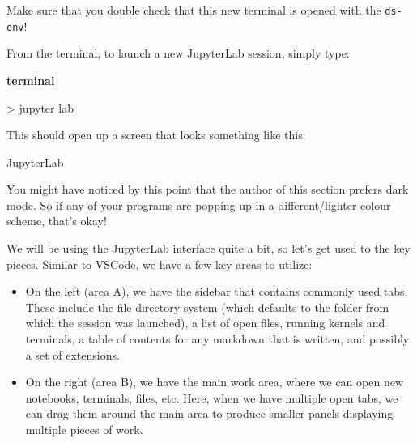 \documentclass[
  letterpaper,
  DIV=11,
  numbers=noendperiod]{scrreprt}
\newenvironment{Shaded}{\begin{snugshade}}{\end{snugshade}}
\newcommand{\ExtensionTok}[1]{\textcolor[rgb]{0.00,0.23,0.31}{#1}}
\newcommand{\NormalTok}[1]{\textcolor[rgb]{0.00,0.23,0.31}{#1}}
\newcommand{\OperatorTok}[1]{\textcolor[rgb]{0.37,0.37,0.37}{#1}}
\begin{document}
\begin{tcolorbox}[enhanced jigsaw, colframe=quarto-callout-note-color-frame, toprule=.15mm, colback=white, leftrule=.75mm, rightrule=.15mm, breakable, colbacktitle=quarto-callout-note-color!10!white, arc=.35mm, bottomtitle=1mm, bottomrule=.15mm, titlerule=0mm, title=\textcolor{quarto-callout-note-color}{\faInfo}\hspace{0.5em}{Conda Reminder!}, toptitle=1mm, left=2mm, opacityback=0, coltitle=black, opacitybacktitle=0.6]
Make sure that you double check that this new terminal is opened with
the \texttt{ds-env}!
\end{tcolorbox}

From the terminal, to launch a new JupyterLab session, simply type:

\textbf{terminal}

\begin{Shaded}
\begin{Highlighting}[]
\OperatorTok{\textgreater{}}\NormalTok{ jupyter }\ExtensionTok{lab}
\end{Highlighting}
\end{Shaded}

This should open up a screen that looks something like this:

JupyterLab

\begin{tcolorbox}[enhanced jigsaw, colframe=quarto-callout-tip-color-frame, toprule=.15mm, colback=white, leftrule=.75mm, rightrule=.15mm, breakable, colbacktitle=quarto-callout-tip-color!10!white, arc=.35mm, bottomtitle=1mm, bottomrule=.15mm, titlerule=0mm, title=\textcolor{quarto-callout-tip-color}{\faLightbulb}\hspace{0.5em}{Fun Fact}, toptitle=1mm, left=2mm, opacityback=0, coltitle=black, opacitybacktitle=0.6]
You might have noticed by this point that the author of this section
prefers dark mode. So if any of your programs are popping up in a
different/lighter colour scheme, that's okay!
\end{tcolorbox}

We will be using the JupyterLab interface quite a bit, so let's get used
to the key pieces. Similar to VSCode, we have a few key areas to
utilize:

\begin{itemize}
\item
  On the left (area A), we have the sidebar that contains commonly used
  tabs. These include the file directory system (which defaults to the
  folder from which the session was launched), a list of open files,
  running kernels and terminals, a table of contents for any markdown
  that is written, and possibly a set of extensions.
\item
  On the right (area B), we have the main work area, where we can open
  new notebooks, terminals, files, etc. Here, when we have multiple open
  tabs, we can drag them around the main area to produce smaller panels
  displaying multiple pieces of work.
\end{itemize}
\end{document}
